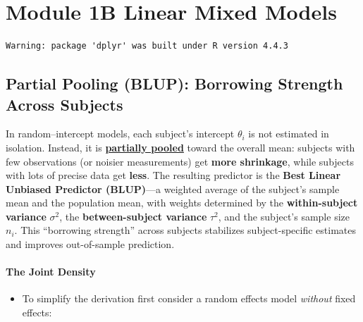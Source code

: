 \documentclass[
  letterpaper,
  DIV=11,
  numbers=noendperiod]{scrreprt}
\providecommand{\tightlist}{%
  \setlength{\itemsep}{0pt}\setlength{\parskip}{0pt}}\usepackage{longtable,booktabs,array}
\begin{document}

\hypertarget{module-1b-linear-mixed-models}{%
\chapter*{Module 1B Linear Mixed
Models}\label{module-1b-linear-mixed-models}}


\begin{verbatim}
Warning: package 'dplyr' was built under R version 4.4.3
\end{verbatim}

\hypertarget{partial-pooling-blup-borrowing-strength-across-subjects}{%
\section*{Partial Pooling (BLUP): Borrowing Strength Across
Subjects}\label{partial-pooling-blup-borrowing-strength-across-subjects}}


In random--intercept models, each subject's intercept \(\theta_i\) is
not estimated in isolation. Instead, it is \ul{\textbf{partially
pooled}} toward the overall mean: subjects with few observations (or
noisier measurements) get \textbf{more shrinkage}, while subjects with
lots of precise data get \textbf{less}. The resulting predictor is the
\textbf{Best Linear Unbiased Predictor (BLUP)}---a weighted average of
the subject's sample mean and the population mean, with weights
determined by the \textbf{within-subject variance} \(\sigma^2\), the
\textbf{between-subject variance} \(\tau^2\), and the subject's sample
size \(n_i\). This ``borrowing strength'' across subjects stabilizes
subject-specific estimates and improves out-of-sample prediction.

\hypertarget{the-joint-density}{%
\subsubsection*{The Joint Density}\label{the-joint-density}}

\begin{itemize}
\tightlist
\item
  To simplify the derivation first consider a random effects model
  \emph{without} fixed effects:
\end{itemize}
\end{document}
